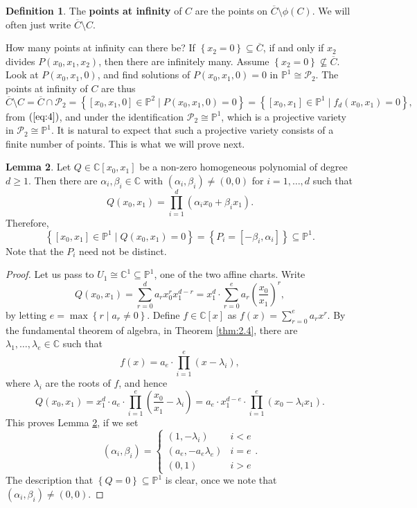 \documentclass{article}
\newcommand{\C}{\mathbb{C}}
\renewcommand{\P}{\mathbb{P}}
\newcommand{\rb}[1]{\left( #1 \right)}
\renewcommand{\sb}[1]{\left[ #1 \right]}
\newcommand{\cb}[1]{\left\{ #1 \right\}}
\theoremstyle{definition}\newtheorem{definition}{Definition}[section]
\theoremstyle{definition}\newtheorem{notation}[definition]{Notation}
\theoremstyle{definition}\newtheorem{remark}[definition]{Remark}
\theoremstyle{definition}\newtheorem{example1}[definition]{Example}
\theoremstyle{definition}\newtheorem{fact}{Fact}
\theoremstyle{definition}\newtheorem{exercise}{Exercise}
\theoremstyle{definition}\newtheorem*{example2}{Example}
\newtheorem{lemma}[definition]{Lemma}
\begin{document}
\begin{definition}
The \textbf{points at infinity} of $ C $ are the points on $ \overline{C} \setminus \phi\rb{C} $. We will often just write $ \overline{C} \setminus C $.
\end{definition}

How many points at infinity can there be? If $ \cb{x_2 = 0} \subseteq \overline{C} $, if and only if $ x_2 $ divides $ P\rb{x_0, x_1, x_2} $, then there are infinitely many. Assume $ \cb{x_2 = 0} \not\subseteq \overline{C} $. Look at $ P\rb{x_0, x_1, 0} $, and find solutions of $ P\rb{x_0, x_1, 0} = 0 $ in $ \P^1 \cong \mathcal{P}_2 $. The points at infinity of $ C $ are thus
$$ \overline{C} \setminus C = \overline{C} \cap \mathcal{P}_2 = \cb{\sb{x_0, x_1, 0} \in \P^2 \mid P\rb{x_0, x_1, 0} = 0} = \cb{\sb{x_0, x_1} \in \P^1 \mid f_d\rb{x_0, x_1} = 0}, $$
from $ \rb{\ref{eq:4}} $, and under the identification $ \mathcal{P}_2 \cong \P^1 $, which is a projective variety in $ \mathcal{P}_2 \cong \P^1 $. It is natural to expect that such a projective variety consists of a finite number of points. This is what we will prove next.

\begin{lemma}
\label{lem:6.2}
Let $ Q \in \C\sb{x_0, x_1} $ be a non-zero homogeneous polynomial of degree $ d \ge 1 $. Then there are $ \alpha_i, \beta_i \in \C $ with $ \rb{\alpha_i, \beta_i} \ne \rb{0, 0} $ for $ i = 1, \dots, d $ such that
$$ Q\rb{x_0, x_1} = \prod_{i = 1}^d \rb{\alpha_ix_0 + \beta_ix_1}. $$
Therefore,
$$ \cb{\sb{x_0, x_1} \in \P^1 \mid Q\rb{x_0, x_1} = 0} = \cb{P_i = \sb{-\beta_i, \alpha_i}} \subseteq \P^1. $$
Note that the $ P_i $ need not be distinct.
\end{lemma}

\begin{proof}
Let us pass to $ U_1 \cong \C^1 \subseteq \P^1 $, one of the two affine charts. Write
$$ Q\rb{x_0, x_1} = \sum_{r = 0}^d a_rx_0^rx_1^{d - r} = x_1^d \cdot \sum_{r = 0}^e a_r\rb{\dfrac{x_0}{x_1}}^r, $$
by letting $ e = \max\cb{r \mid a_r \ne 0} $. Define $ f \in \C\sb{x} $ as $ f\rb{x} = \sum_{r = 0}^e a_rx^r $. By the fundamental theorem of algebra, in Theorem \ref{thm:2.4}, there are $ \lambda_1, \dots, \lambda_e \in \C $ such that
$$ f\rb{x} = a_e \cdot \prod_{i = 1}^e \rb{x - \lambda_i}, $$
where $ \lambda_i $ are the roots of $ f $, and hence
$$ Q\rb{x_0, x_1} = x_1^d \cdot a_e \cdot \prod_{i = 1}^e \rb{\dfrac{x_0}{x_1} - \lambda_i} = a_e \cdot x_1^{d - e} \cdot \prod_{i = 1}^e \rb{x_0 - \lambda_ix_1}. $$
This proves Lemma \ref{lem:6.2}, if we set
$$ \rb{\alpha_i, \beta_i} = \begin{cases}
\rb{1, -\lambda_i} & i < e \\
\rb{a_e, -a_e\lambda_e} & i = e \\
\rb{0, 1} & i > e
\end{cases}. $$
The description that $ \cb{Q = 0} \subseteq \P^1 $ is clear, once we note that $ \rb{\alpha_i, \beta_i} \ne \rb{0, 0} $.
\end{proof}
\end{document}
